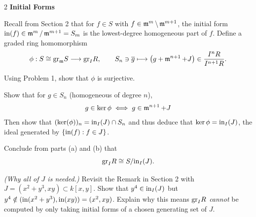 \documentclass[12pt]{article}
\begin{document}


\begin{problem}{2} \textbf{Initial Forms}
    \begin{enumalph}     
        \item Recall from Section 2 that for $f \in S$ with $f \in \operatorname{\mathfrak{m}}^m \setminus  \operatorname{\mathfrak{m}}^{m+1}$, the initial form $\text{in}(f) \in \operatorname{\mathfrak{m}}^m/\operatorname{\mathfrak{m}}^{m+1} = S_m$ is the  lowest-degree homogeneous part of $f$. Define a graded ring  homomorphism 
        \[\phi : S \cong \text{gr}_{\operatorname{\mathfrak{m}}} S \longrightarrow \text{gr}_I R, \qquad  S_n \ni \overline{g} \longmapsto \big(g + \operatorname{\mathfrak{m}}^{n+1} + J\big)  \in \frac{I^n R}{I^{n+1}R}.\] 
        
        Using Problem 1, show that $\phi$ is surjective.  

        \item Show that for $g \in S_n$ (homogeneous of degree $n$), 
        \[g \in \ker \phi \iff g \in \operatorname{\mathfrak{m}}^{n+1} + J\] 
        Then show that $(\ker(\phi))_n = \text{in}_I(J) \cap S_n$ and thus deduce that $\ker\phi = \text{in}_I(J)$, the ideal generated by 
        $\{\text{in}(f) : f \in J\}$.

        \item Conclude from parts (a) and (b) that
        \[\text{gr}_I R \cong S/\text{in}_I(J).\]

        \item \emph{(Why all of $J$ is needed.)} Revisit the Remark in Section 2 with 
        $J = (x^2 + y^3, xy) \subset k[x,y]$. Show that $y^4 \in \text{in}_I(J)$ but 
        $y^4 \notin (\text{in}(x^2+y^3), \text{in}(xy)) = (x^2, xy)$. Explain why this 
        means $\text{gr}_I R$ \emph{cannot} be computed by only taking initial forms 
        of a chosen generating set of $J$. 
    \end{enumalph}
\end{problem}
\end{document}
